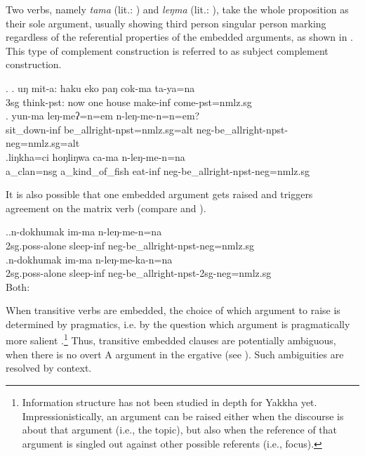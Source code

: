 Two verbs, namely \emph{tama}  (lit.: ) and \emph{leŋma}  (lit.: ), take the whole proposition as their sole argument, usually showing third person singular person marking regardless of the referential properties of the embedded arguments, as shown in \Next. This type of complement construction is referred to as subject complement construction.

\ex. \ag. uŋ mit-a:       haku eko paŋ  cok-ma    ta-ya=na\\
	{\sc 3sg} think{\sc [3sg]-pst}: now one house make-{\sc inf} come{\sc [3sg]-pst=nmlz.sg}\\
	 
 	\bg. yun-ma leŋ-meʔ=n=em n-leŋ-me-n=n=em?\\
	sit\_down{\sc -inf} be\_allright{\sc [3sg]-npst=nmlz.sg=alt} {\sc neg-}be\_allright{\sc [3sg]-npst-neg=nmlz.sg=alt}\\
	\bg.liŋkha=ci hoŋliŋwa ca-ma n-leŋ-me-n=na\\
	a\_clan{\sc =nsg} a\_kind\_of\_fish eat{\sc -inf}	{\sc neg-}be\_allright{\sc [3sg]-npst-neg=nmlz.sg}\\ 

It is also possible that one embedded argument gets raised and triggers agreement on the matrix verb (compare \Next[a] and \Next[b]). 

\ex.\ag.n-dokhumak im-ma n-leŋ-me-n=na\\
{\sc 2sg.poss-}alone sleep{\sc -inf} {\sc neg-}be\_allright{\sc [3sg]-npst-neg=nmlz.sg}\\
\bg.n-dokhumak im-ma n-leŋ-me-ka-n=na\\
{\sc 2sg.poss-}alone sleep{\sc -inf} {\sc neg-}be\_allright{\sc -npst-2sg-neg=nmlz.sg}\\
Both: 


When transitive verbs are embedded, the choice of which argument to raise is determined by pragmatics, i.e. by the question which argument is pragmatically more salient \Next.\footnote{Information structure has not been studied in depth for Yakkha yet. Impressionistically, an argument can be raised either when the discourse is about that argument (i.e., the topic), but also when the reference of that argument is singled out against other possible referents (i.e., focus).} Thus, transitive embedded clauses are potentially  ambiguous, when there is no overt A argument in the ergative (see \Next[b]). Such ambiguities are resolved by context.

